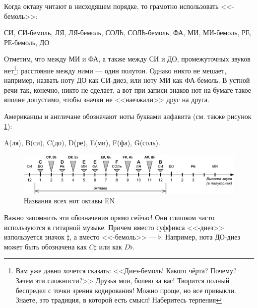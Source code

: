 Когда октаву читают в нисходящем порядке, то грамотно использовать <<-бемоль>>:
\begin{center}
    СИ, СИ-бемоль, ЛЯ, ЛЯ-бемоль, СОЛЬ, СОЛЬ-бемоль, ФА, МИ, МИ-бемоль, РЕ, РЕ-бемоль, ДО
\end{center}

Отметим, что между МИ и ФА, а также между СИ и ДО, промежуточных звуков нет\footnote{Вам уже давно хочется сказать: <<Диез-бемоль! Какого чёрта? Почему? Зачем эти сложности?>> Друзья мои, болею за вас! Творится полный беспредел с точки зрения кодирования! Можно проще, но все привыкли. Знаете, это традиция, в которой есть смысл! Наберитесь терпения}: расстояние между ними --- один полутон. Однако никто не мешает, например, назвать ноту ДО как СИ-диез, или ноту МИ как ФА-бемоль. В устной речи так, конечно, никто не сделает, а вот при записи знаков нот на бумаге такое вполне допустимо, чтобы значки не <<наезжали>> друг на друга.

Американцы и англичане обозначают ноты буквами алфавита (см. также рисунок \ref{fig:notes:names:all:EN}): 
\begin{center}
    A(ля), B(си), C(до), D(ре), E(ми), F(фа), G(соль).
\end{center}

\begin{figure}[!ht]
    \centering
    \includegraphics[width=\textwidth]{fig/notes/notes-all-en} 
    \caption{Названия всех нот октавы EN}\label{fig:notes:names:all:EN}
\end{figure} 

Важно запомнить эти обозначения прямо сейчас! Они слишком часто используются в гитарной музыке. Причем вместо суффикса <<-диез>> изпользуется значок $\sharp$, а вместо <<-бемоль>> --- $\flat$. Например, нота ДО-диез может быть обозначена как $C\sharp$ или как $D\flat$.

